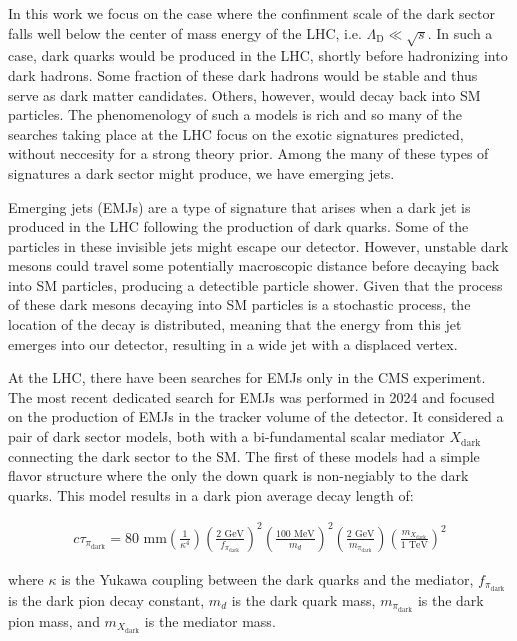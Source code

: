 In this work we focus on the case where the confinment scale of the dark sector falls well below the center of mass energy of the LHC, i.e. $\Lambda_{\text{D}} \ll \sqrt{s}$. In such a case, dark quarks would be produced in the LHC, shortly before hadronizing into dark hadrons. Some fraction of these dark hadrons would be stable and thus serve as dark matter candidates. Others, however, would decay back into SM particles. The phenomenology of such a models is rich and so many of the searches taking place at the LHC focus on the exotic signatures predicted, without neccesity for a strong theory prior. Among the many of these types of signatures a dark sector might produce, we have emerging jets.

Emerging jets (EMJs) are a type of signature that arises when a dark jet is produced in the LHC following the production of dark quarks. Some of the particles in these invisible jets might escape our detector. However, unstable dark mesons could travel some potentially macroscopic distance before decaying back into SM particles, producing a detectible particle shower. Given that the process of these dark mesons decaying into SM particles is a stochastic process, the location of the decay is distributed, meaning that the energy from this jet emerges into our detector, resulting in a wide jet with a displaced vertex.

At the LHC, there have been searches for EMJs only in the CMS experiment. The most recent dedicated search for EMJs \cite{cmscollaborationSearchNewPhysics2024} was performed in 2024 and focused on the production of EMJs in the tracker volume of the detector. It considered a pair of dark sector models, both with a bi-fundamental scalar mediator $X_{\text{dark}}$ connecting the dark sector to the SM. The first of these models had a simple flavor structure where the only the down quark is non-negiably to the dark quarks. This model results in a dark pion average decay length of:

\begin{equation}
	\begin{aligned}
		c\tau_{\pi_{\text{dark}}} = 80 \text{ mm} \left(\frac{1}{\kappa^4}\right) \left(\frac{2 \text{ GeV}}{f_{\pi_{\text{dark}}}}\right)^2 \left(\frac{100 \text{ MeV}}{m_d}\right)^2 \left(\frac{2 \text{ GeV}}{m_{\pi_{\text{dark}}}}\right)  \left(\frac{m_{X_{\text{dark}}}}{1 \text{ TeV}}\right)^2
	\end{aligned}
\end{equation}

where $\kappa$ is the Yukawa coupling between the dark quarks and the mediator, $f_{\pi_{\text{dark}}}$ is the dark pion decay constant, $m_d$ is the dark quark mass, $m_{\pi_{\text{dark}}}$ is the dark pion mass, and $m_{X_{\text{dark}}}$ is the mediator mass.

